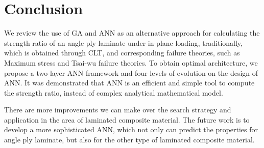 \section{Conclusion}
We review the use of GA and ANN as an alternative approach for calculating the
strength ratio of an angle ply laminate under in-plane loading, traditionally,
which is obtained through CLT, and corresponding failure theories, such as
Maximum stress and Tsai-wu failure theories. To obtain optimal architecture, we
propose a two-layer ANN framework and four levels of evolution on the design of
ANN. It was demonstrated that ANN is an efficient and simple tool to compute
the strength ratio, instead of complex analytical mathematical model.


There are more improvements we can make over the search strategy and 
application in the area of laminated composite material. The future work is to
develop a more sophisticated ANN, which not only can predict the
properties for angle ply laminate, but also for the other type of laminated
composite material.
